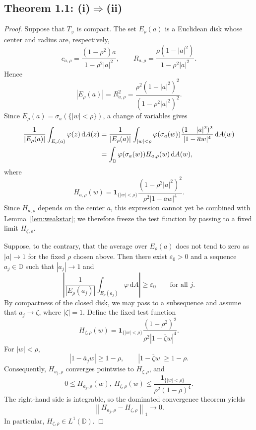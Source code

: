 \documentclass[12pt,a4paper]{article}
\theoremstyle{remark}
\newcommand{\D}{\mathbb D}
\newcommand{\dA}{\,\mathrm dA}
\newcommand{\norm}[1]{\left\lVert#1\right\rVert}
\newcommand{\abs}[1]{\left\lvert#1\right\rvert}
\begin{document}
\subsection{Theorem 1.1: \texorpdfstring{\textnormal{(i)}$\Rightarrow$\textnormal{(ii)}}{(i) implies (ii)}}\label{sec:necessity}
\begin{proof}
Suppose that $T_\varphi$ is compact.
The set $E_\rho(a)$ is a Euclidean disk whose center and radius are, respectively,
\[
c_{a,\rho}=\frac{(1-\rho^2)a}{1-\rho^2|a|^2},
\qquad
R_{a,\rho}=\frac{\rho(1-|a|^2)}{1-\rho^2|a|^2}.
\]
Hence
\begin{equation}\label{eq:area}
|E_\rho(a)|=R_{a,\rho}^2
=\frac{\rho^2(1-|a|^2)^2}{(1-\rho^2|a|^2)^2}.
\end{equation}
Since $E_\rho(a)=\sigma_a(\{|w|<\rho\})$, a change of variables gives
\begin{align}
\frac1{|E_\rho(a)|}\int_{E_\rho(a)}\varphi(z)\dA(z)
&=\frac1{|E_\rho(a)|}\int_{|w|<\rho}
 \varphi(\sigma_a(w))\frac{(1-|a|^2)^2}{|1-\overline a w|^4}\dA(w)\notag\\
&=\int_\D\varphi(\sigma_a(w))H_{a,\rho}(w)\dA(w),\label{eq:average}
\end{align}
where
\begin{equation}\label{eq:weight}
H_{a,\rho}(w)=\mathbf1_{\{|w|<\rho\}}
\frac{(1-\rho^2|a|^2)^2}{\rho^2|1-\overline a w|^4}.
\end{equation}
Since $H_{a,\rho}$ depends on the center $a$, this expression cannot yet be combined with Lemma~\ref{lem:weakstar}; we therefore freeze the test function by passing to a fixed limit 
$H_{\zeta,\rho}.$

Suppose, to the contrary, that the average over $E_\rho(a)$ does not tend to zero as $|a|\to1$ for the fixed $\rho$ chosen above. Then there exist $\varepsilon_0>0$ and a sequence $a_j\in\D$
 such that $|a_j|\to1$ and
\begin{equation}\label{eq:contradiction}
\abs{\frac1{|E_\rho(a_j)|}\int_{E_\rho(a_j)}\varphi\dA}
\ge\varepsilon_0\qquad\text{for all }j.
\end{equation}
By compactness of the closed disk, we may pass to a subsequence and assume that $a_j\to\zeta$, where $|\zeta|=1$.
Define the fixed test function
\[
H_{\zeta,\rho}(w)=\mathbf1_{\{|w|<\rho\}}
\frac{(1-\rho^2)^2}{\rho^2|1-\overline\zeta w|^4}.
\]
For $|w|<\rho$,
\[
|1-\overline a_j w|\ge1-\rho,
\qquad |1-\overline\zeta w|\ge1-\rho.
\]
Consequently, $H_{a_j,\rho}$ converges pointwise to $H_{\zeta,\rho}$, and
\[
0\le H_{a_j,\rho}(w),\ H_{\zeta,\rho}(w)
\le\frac{\mathbf1_{\{|w|<\rho\}}}{\rho^2(1-\rho)^4}.
\]
The right-hand side is integrable, so the dominated convergence theorem yields
\begin{equation}\label{eq:L1}
\norm{H_{a_j,\rho}-H_{\zeta,\rho}}_1\longrightarrow0.
\end{equation}
In particular, $H_{\zeta,\rho}\in L^1(\D)$.



\end{proof}
\end{document}
